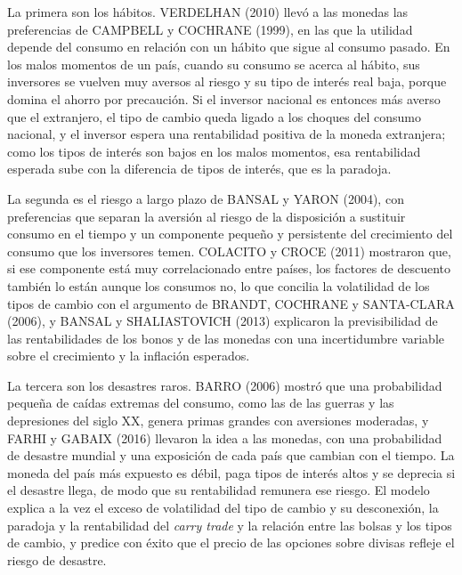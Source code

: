 \documentclass[10pt,a4paper]{article}
\begin{document}
La primera son los hábitos. VERDELHAN (2010) llevó a las monedas las preferencias de CAMPBELL y COCHRANE (1999), en las que la utilidad depende del consumo en relación con un hábito que sigue al consumo pasado. En los malos momentos de un país, cuando su consumo se acerca al hábito, sus inversores se vuelven muy aversos al riesgo y su tipo de interés real baja, porque domina el ahorro por precaución. Si el inversor nacional es entonces más averso que el extranjero, el tipo de cambio queda ligado a los choques del consumo nacional, y el inversor espera una rentabilidad positiva de la moneda extranjera; como los tipos de interés son bajos en los malos momentos, esa rentabilidad esperada sube con la diferencia de tipos de interés, que es la paradoja.

La segunda es el riesgo a largo plazo de BANSAL y YARON (2004), con preferencias que separan la aversión al riesgo de la disposición a sustituir consumo en el tiempo y un componente pequeño y persistente del crecimiento del consumo que los inversores temen. COLACITO y CROCE (2011) mostraron que, si ese componente está muy correlacionado entre países, los factores de descuento también lo están aunque los consumos no, lo que concilia la volatilidad de los tipos de cambio con el argumento de BRANDT, COCHRANE y SANTA-CLARA (2006), y BANSAL y SHALIASTOVICH (2013) explicaron la previsibilidad de las rentabilidades de los bonos y de las monedas con una incertidumbre variable sobre el crecimiento y la inflación esperados.

La tercera son los desastres raros. BARRO (2006) mostró que una probabilidad pequeña de caídas extremas del consumo, como las de las guerras y las depresiones del siglo XX, genera primas grandes con aversiones moderadas, y FARHI y GABAIX (2016) llevaron la idea a las monedas, con una probabilidad de desastre mundial y una exposición de cada país que cambian con el tiempo. La moneda del país más expuesto es débil, paga tipos de interés altos y se deprecia si el desastre llega, de modo que su rentabilidad remunera ese riesgo. El modelo explica a la vez el exceso de volatilidad del tipo de cambio y su desconexión, la paradoja y la rentabilidad del \textit{carry trade} y la relación entre las bolsas y los tipos de cambio, y predice con éxito que el precio de las opciones sobre divisas refleje el riesgo de desastre.
\end{document}

